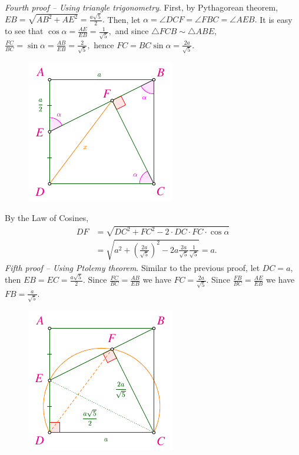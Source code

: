 \begin{multicols}{2}
	\vskip 0.1cm
	\textit{Fourth proof -- Using triangle trigonometry}.
	First, by Pythagorean theorem, $EB = \sqrt{AB^2 +AE^2} = \frac{a\sqrt{5}}{2}.$
	Then, let $\alpha = \angle DCF = \angle FBC = \angle AEB.$
	It is easy to see that $\cos{\alpha} = \frac{AE}{EB} = \frac{1}{\sqrt{5}},$
	and since $\triangle FCB \sim \triangle ABE$, $\frac{FC}{BC} = \sin{\alpha} = \frac{AB}{EB} = \frac{2}{\sqrt{5}},$
	hence $FC = BC \sin{\alpha} = \frac{2a}{\sqrt{5}}.$
	\begin{figure}[H]
		\vspace*{-10pt}
		\centering
		\captionsetup{labelformat= empty, justification=centering}
		\includegraphics[width= 0.65\linewidth]{2022-2-ms-1-1-h.pdf}
		\vspace*{-15pt}
	\end{figure}	
	By the Law of Cosines,
	\begin{align*}
		DF &= \sqrt{DC^2 +  FC^2 - 2\cdot DC\cdot FC\cdot\cos{\alpha}}\\
		&= \sqrt{a^2 + \left(\frac{2a}{\sqrt{5}}\right)^2 - 2a \frac{2a}{\sqrt{5}} \frac{1}{\sqrt{5}}} = a.
	\end{align*}
	\textit{Fifth proof -- Using Ptolemy theorem}.
	Similar to the previous proof,
	let $DC = a$, then $EB = EC = \frac{a\sqrt{5}}{2}.$ Since
	$\frac{FC}{BC} = \frac{AB}{EB}$ we have $FC=\frac{2a}{\sqrt{5}}.$ Since
	$\frac{FB}{BC} = \frac{AE}{EB}$ we have $FB=\frac{a}{\sqrt{5}}.$
	\begin{figure}[H]
		\vspace*{-15pt}
		\centering
		\captionsetup{labelformat= empty, justification=centering}
		\includegraphics[width= 0.65\linewidth]{2022-2-ms-1-1-i.pdf}

\end{figure}
\end{multicols}

